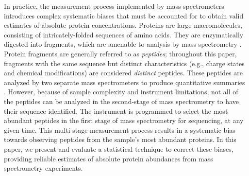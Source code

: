 In practice, the measurement process implemented by mass spectrometers introduces complex systematic biases that must be accounted for to obtain valid estimates of absolute protein concentrations.
Proteins are large macromolecules, consisting of intricately-folded sequences of amino acids. 
They are enzymatically digested into fragments, which are amenable to analysis by mass spectrometry \citep{Thakur:2011kz}. 
Protein fragments are generally referred to as {\em peptides}; throughout this paper, fragments with the same sequence but distinct characteristics (e.g., charge states and chemical modifications) are considered {\em distinct} peptides. 
These peptides are analyzed by two separate mass spectrometers to produce quantitative summaries \citep{Steen:2004tk}.
 However, because of sample complexity and instrument limitations, not all of the peptides can be analyzed in the second-stage of mass spectrometry to have their sequence identified.
The instrument is programmed to select the most abundant peptides in the first stage of mass spectrometry for sequencing, at any given time.
This multi-stage measurement process results in a systematic bias towards observing peptides from the sample's most abundant proteins.
In this paper, we present and evaluate a statistical technique to correct these biases, providing reliable estimates of absolute protein abundances from mass spectrometry experiments.

